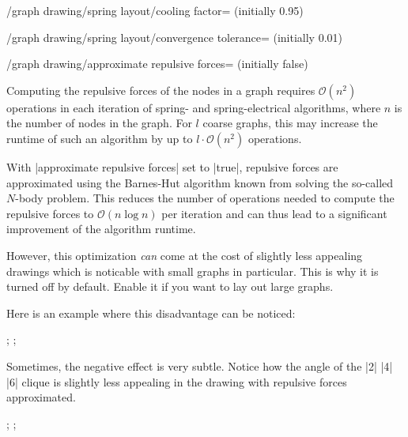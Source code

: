 \begin{key}{/graph drawing/spring layout/cooling factor=
  (initially 0.95)}
\end{key}

\begin{key}{/graph drawing/spring layout/convergence
  tolerance= (initially 0.01)}
\end{key}

\begin{key}{/graph drawing/approximate repulsive 
  forces= (initially false)}
  
  Computing the repulsive forces of the nodes in a graph requires 
  $\mathcal{O}(n^2)$ operations in each iteration of spring- and
  spring-electrical algorithms, where $n$ is the number of nodes in
  the graph. For $l$ coarse graphs, this may increase the runtime of 
  such an algorithm by up to $l\cdot\mathcal{O}(n^2)$ operations. 

  With |approximate repulsive forces| set to |true|, repulsive forces 
  are approximated using the Barnes-Hut algorithm known from solving the
  so-called $N$-body problem. This reduces the number of operations
  needed to compute the repulsive forces to $\mathcal{O}(n\log n)$ per 
  iteration and can thus lead to a significant improvement of the 
  algorithm runtime.
  
  However, this optimization \emph{can} come at the cost of slightly 
  less appealing drawings which is noticable with small graphs in 
  particular. This is why it is turned off by default. Enable it if you
  want to lay out large graphs.

  Here is an example where this disadvantage can be noticed:
  \begin{codeexample}[]
\tikz {};
\tikz {};
  \end{codeexample}

  Sometimes, the negative effect is very subtle. Notice how the angle
  of the |2| |4| |6| clique is slightly less appealing in the drawing
  with repulsive forces approximated.
  \begin{codeexample}[]
\tikz {};
\tikz {};
  \end{codeexample}


\end{key}
